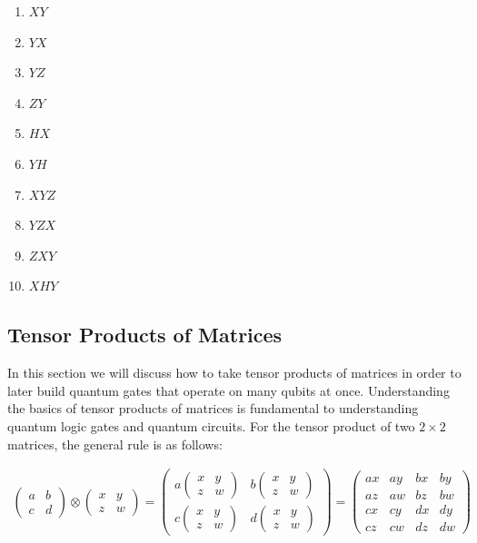 \documentclass[11pt]{article}
\providecommand{\tightlist}{%
      \setlength{\itemsep}{0pt}\setlength{\parskip}{0pt}}
\begin{document}
\begin{enumerate}
\def\labelenumi{\arabic{enumi}.}
\tightlist
\item
  \(XY\)
\item
  \(YX\)
\item
  \(YZ\)
\item
  \(ZY\)
\item
  \(HX\)
\item
  \(YH\)
\item
  \(XYZ\)
\item
  \(YZX\)
\item
  \(ZXY\)
\item
  \(XHY\)
\end{enumerate}

    \hypertarget{tensor-products-of-matrices}{%
\subsection{Tensor Products of
Matrices}\label{tensor-products-of-matrices}}

    In this section we will discuss how to take tensor products of matrices
in order to later build quantum gates that operate on many qubits at
once. Understanding the basics of tensor products of matrices is
fundamental to understanding quantum logic gates and quantum circuits.
For the tensor product of two \(2 \times 2\) matrices, the general rule
is as follows:

    \begin{align}
\begin{pmatrix}
a & b \\
c & d
\end{pmatrix} \otimes 
\begin{pmatrix}
x & y \\
z & w
\end{pmatrix} = 
\begin{pmatrix}
a \begin{pmatrix}
x & y \\
z & w
\end{pmatrix} & b \begin{pmatrix}
x & y \\
z & w
\end{pmatrix} \\
c \begin{pmatrix}
x & y \\
z & w
\end{pmatrix} & d \begin{pmatrix}
x & y \\
z & w
\end{pmatrix}
\end{pmatrix} = 
\begin{pmatrix}
ax & ay & bx & by \\
az & aw & bz & bw \\
cx & cy & dx & dy \\
cz & cw & dz & dw
\end{pmatrix}
\end{align}
\end{document}
